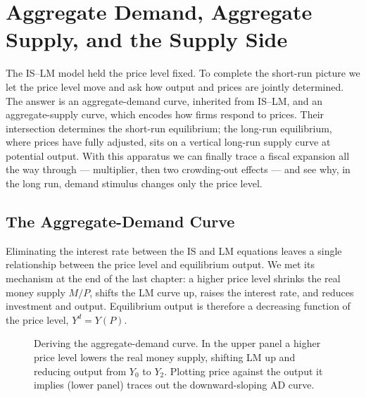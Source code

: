 \chapter{Aggregate Demand, Aggregate Supply, and the Supply Side}
\label{ch:adas}

The IS--LM model held the price level fixed. To complete the short-run picture we let the price level move and ask how output and prices are jointly determined. The answer is an aggregate-demand curve, inherited from IS--LM, and an aggregate-supply curve, which encodes how firms respond to prices. Their intersection determines the short-run equilibrium; the long-run equilibrium, where prices have fully adjusted, sits on a vertical long-run supply curve at potential output. With this apparatus we can finally trace a fiscal expansion all the way through --- multiplier, then two crowding-out effects --- and see why, in the long run, demand stimulus changes only the price level.

\section{The Aggregate-Demand Curve}

Eliminating the interest rate between the IS and LM equations leaves a single relationship between the price level and equilibrium output. We met its mechanism at the end of the last chapter: a higher price level shrinks the real money supply $M/P$, shifts the LM curve up, raises the interest rate, and reduces investment and output. Equilibrium output is therefore a decreasing function of the price level, $Y^{d}=Y(P)$.

\begin{figure}[h]
\centering

\caption{Deriving the aggregate-demand curve. In the upper panel a higher price level lowers the real money supply, shifting LM up and reducing output from $Y_0$ to $Y_2$. Plotting price against the output it implies (lower panel) traces out the downward-sloping AD curve.}
\label{fig:macro-25}
\end{figure}


